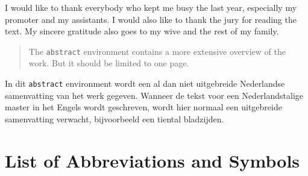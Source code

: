 \documentclass[master=cws,masteroption=se,english]{kulemt}
\begin{document}
\begin{preface}
  I would like to thank everybody who kept me busy the last year,
  especially my promoter and my assistants. I would also like to thank the
  jury for reading the text. My sincere gratitude also goes to my wive and
  the rest of my family. 
\end{preface}

\listoftodos
\tableofcontents*

\begin{abstract}
  The \texttt{abstract} environment contains a more extensive overview of
  the work. But it should be limited to one page.
\end{abstract}

\begin{abstract*}
  In dit \texttt{abstract} environment wordt een al dan niet uitgebreide
  Nederlandse samenvatting van het werk gegeven.
  Wanneer de tekst voor een Nederlandstalige master in het Engels wordt
  geschreven, wordt hier normaal een uitgebreide samenvatting verwacht,
  bijvoorbeeld een tiental bladzijden. 
\end{abstract*}

\listoffiguresandtables
\chapter{List of Abbreviations and Symbols}
\end{document}
